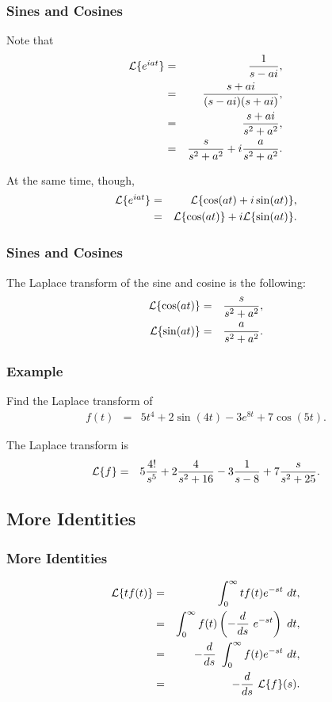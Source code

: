 \begin{frame}
  \frametitle{Sines and Cosines}

  Note that
  \begin{eqnarray*}
    \laplace{e^{iat}} & = & \frac{1}{s-ai}, \\
    & = & \frac{s+ai}{(s-ai)(s+ai)}, \\
    & = & \frac{s+ai}{s^2+a^2}, \\
    & = & \frac{s}{s^2+a^2} + i \frac{a}{s^2+a^2}.
  \end{eqnarray*}

  At the same time, though,
  \begin{eqnarray*}
    \laplace{e^{iat}} & = & \laplace{\cos(at) + i \sin(at)}, \\
    & = & \laplace{\cos(at)} + i \laplace{\sin(at)}.
  \end{eqnarray*}


\end{frame}


\begin{frame}
  \frametitle{Sines and Cosines}

  The Laplace transform of the sine and cosine is the following:
  \begin{eqnarray*}
    \laplace{\cos(at)} & = & \frac{s}{s^2+a^2}, \\
    \laplace{\sin(at)} & = & \frac{a}{s^2+a^2}.
  \end{eqnarray*}


\end{frame}


\begin{frame}
  \frametitle{Example}

  Find the Laplace transform of 
  \begin{eqnarray*}
    f(t) & = & 5t^4 + 2\sin(4t) - 3 e^{8t} + 7 \cos(5t).
  \end{eqnarray*}

  The Laplace transform is
  \begin{eqnarray*}
    \laplace{f} & = & 5 \frac{4!}{s^5} + 2 \frac{4}{s^2+16}  - 3\frac{1}{s-8} + 7 \frac{s}{s^2+25}.
  \end{eqnarray*}

\end{frame}

\subsection{More Identities}

\begin{frame}
  \frametitle{More Identities}

  \begin{eqnarray*}
    \laplace{t f(t)} & = & \int^\infty_0 t f(t) e^{-st} ~ dt, \\
    & = & \int^\infty_0 f(t) \lp -\deriv{~}{s} e^{-st} \rp ~ dt, \\
    & = & -\deriv{~}{s} \int^\infty_0 f(t) e^{-st}  ~ dt, \\
    & = & -\deriv{~}{s} \laplace{f}(s).
  \end{eqnarray*}

\end{frame}

